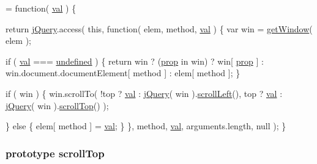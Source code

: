 \begin{DoxyCode}
= \textcolor{keyword}{function}( \hyperlink{jquery-1_810_82-vsdoc_8js_a0888cacd53defa08fbb4972d54ece4b0}{val} ) \{


        \textcolor{keywordflow}{return} \hyperlink{jquery-1_810_82-vsdoc_8js_add5237586d970a38a81f990e8eb28c6c}{jQuery}.access( \textcolor{keyword}{this}, \textcolor{keyword}{function}( elem, method, \hyperlink{jquery-1_810_82-vsdoc_8js_a0888cacd53defa08fbb4972d54ece4b0}{val} ) \{
            var win = \hyperlink{jquery-1_810_82_8js_ab8e6e1fb3b8b51b6afe437c63df0e09f}{getWindow}( elem );

            \textcolor{keywordflow}{if} ( \hyperlink{jquery-1_810_82-vsdoc_8js_a0888cacd53defa08fbb4972d54ece4b0}{val} === \hyperlink{jquery-1_810_82-vsdoc_8js_a08113a236cc18d2a9d5ce27e638012be}{undefined} ) \{
                \textcolor{keywordflow}{return} win ? (\hyperlink{jquery-1_810_82-vsdoc_8js_af17be84954030af6c2286f5da385d41b}{prop} in win) ? win[ \hyperlink{jquery-1_810_82-vsdoc_8js_af17be84954030af6c2286f5da385d41b}{prop} ] :
                    win.document.documentElement[ method ] :
                    elem[ method ];
            \}

            \textcolor{keywordflow}{if} ( win ) \{
                win.scrollTo(
                    !top ? \hyperlink{jquery-1_810_82-vsdoc_8js_a0888cacd53defa08fbb4972d54ece4b0}{val} : \hyperlink{jquery-1_810_82-vsdoc_8js_add5237586d970a38a81f990e8eb28c6c}{jQuery}( win ).\hyperlink{jquery-1_810_82-vsdoc_8js_accc573ddf4124d723e9a6da272bb24f2}{scrollLeft}(),
                    top ? \hyperlink{jquery-1_810_82-vsdoc_8js_a0888cacd53defa08fbb4972d54ece4b0}{val} : \hyperlink{jquery-1_810_82-vsdoc_8js_add5237586d970a38a81f990e8eb28c6c}{jQuery}( win ).\hyperlink{jquery-1_810_82-vsdoc_8js_a1b81b50a7190916ff4f07febc824b85d}{scrollTop}()
                );

            \} \textcolor{keywordflow}{else} \{
                elem[ method ] = \hyperlink{jquery-1_810_82-vsdoc_8js_a0888cacd53defa08fbb4972d54ece4b0}{val};
            \}
        \}, method, \hyperlink{jquery-1_810_82-vsdoc_8js_a0888cacd53defa08fbb4972d54ece4b0}{val}, arguments.length, null );
    \}
\end{DoxyCode}
\hypertarget{jquery-1_810_82-vsdoc_8js_a1b81b50a7190916ff4f07febc824b85d}{
\subsubsection[{scroll\-Top}]{ {\bf prototype} scroll\-Top}}\label{jquery-1_810_82-vsdoc_8js_a1b81b50a7190916ff4f07febc824b85d}
